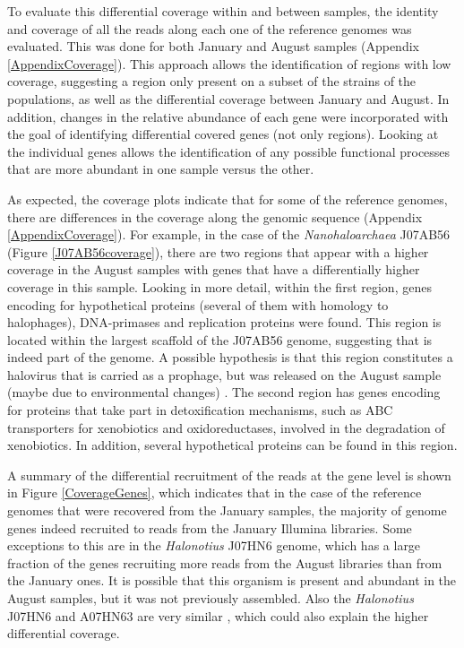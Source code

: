To evaluate this differential coverage within and between samples, the identity and coverage of all the reads along each one of the reference genomes was evaluated. This was done for both January and August samples (Appendix \ref{AppendixCoverage}). This approach allows the identification of regions with low coverage, suggesting a region only present on a subset of the strains of the populations, as well as the differential coverage between January and August. In addition, changes in the relative abundance of each gene were incorporated with the goal of identifying differential covered genes (not only regions). Looking at the individual genes allows the identification of any possible functional processes that are more abundant in one sample versus the other.

As expected, the coverage plots indicate that for some of the reference genomes, there are differences in the coverage along the genomic sequence (Appendix \ref{AppendixCoverage}). For example, in the case of the \textit{Nanohaloarchaea} J07AB56 (Figure \ref{J07AB56coverage}), there are two regions that appear with a higher coverage in the August samples with genes that have a differentially higher coverage in this sample. Looking in more detail, within the first region, genes encoding for hypothetical proteins (several of them with homology to halophages), DNA-primases and replication proteins were found. This region is located within the largest scaffold of the J07AB56 genome, suggesting that is indeed part of the genome. A possible hypothesis is that this region constitutes a halovirus that is carried as a prophage, but was released on the August sample (maybe due to environmental changes) \cite{Porter:2007jw}. The second region has genes encoding for proteins that take part in detoxification mechanisms, such as ABC transporters for xenobiotics and oxidoreductases, involved in the degradation of xenobiotics. In addition, several hypothetical proteins can be found in this region.



A summary of the differential recruitment of the reads at the gene level is shown in Figure \ref{CoverageGenes}, which indicates that in the case of the reference genomes that were recovered from the January samples, the majority of genome genes indeed recruited to reads from the January Illumina libraries. Some exceptions to this are in the \textit{Halonotius} J07HN6 genome, which has a large fraction of the genes recruiting more reads from the August libraries than from the January ones. It is possible that this organism is present and abundant in the August samples, but it was not previously assembled. Also the \textit{Halonotius} J07HN6 and A07HN63 are very similar \cite{Podell:2013fp}, which could also explain the higher differential coverage.

